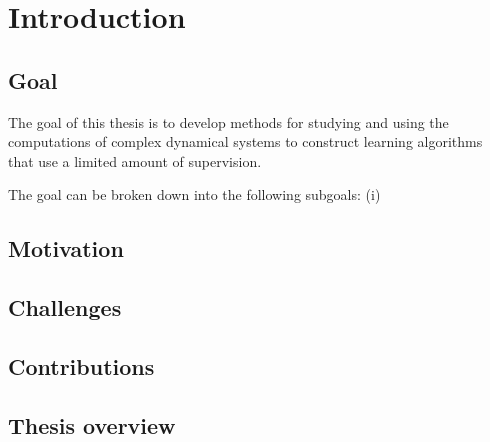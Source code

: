 \chapter{Introduction}


\section{Goal}

The goal of this thesis is to develop methods for studying and using the
computations of complex dynamical systems to construct learning algorithms that
use a limited amount of supervision.

The goal can be broken down into the following subgoals: (i)

\section{Motivation}



\section{Challenges}

\section{Contributions}
\section{Thesis overview}

